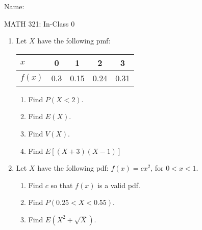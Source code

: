 \documentclass{article}
\begin{document}
\hspace{375pt}Name:

\begin{center}
{\Huge MATH 321: In-Class 0}
\end{center}

\bigskip\bigskip


\begin{enumerate}
    \item Let $X$ have the following pmf:\hspace{40pt}
    \begin{tabular}{| l || c | c | c | c |}
        \hline
        $x$ & 0 & 1 & 2 & 3\\
        \hline
        $f(x)$ & 0.3 & 0.15 & 0.24 & 0.31\\
        \hline
    \end{tabular}\bigskip
    \begin{enumerate}
        \item Find $P(X < 2)$.\vspace{100pt}
        \item Find $E(X)$.\vspace{120pt}
        \item Find $V(X)$.\vspace{120pt}
        \item Find $E[(X + 3)(X -1)]$\vspace{120pt}
    \end{enumerate}\bigskip
    
    \newpage
    
    \item Let $X$ have the following pdf: \hspace{40pt} $f(x) = cx^2$, for $0 < x < 1$.
    \begin{enumerate}
        \item Find $c$ so that $f(x)$ is a valid pdf.\vspace{200pt}
        \item Find $P(0.25 < X < 0.55)$.\vspace{200pt}
        \item Find $E(X^2 + \sqrt{X})$.\vspace{200pt}
    \end{enumerate}
\end{enumerate}
\end{document}
